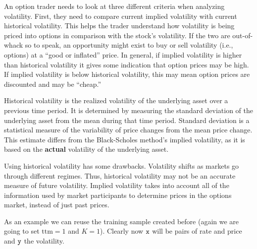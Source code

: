 An option trader needs to look at three different criteria when analyzing volatility. First, they need to compare current implied volatility with current historical volatility. This helps the trader understand how volatility is being priced into options in comparison with the stock’s volatility. If the two are out-of-whack so to speak, an opportunity might exist to buy or sell volatility (i.e., options) at a “good or inflated” price. In general, if implied volatility is higher than historical volatility it gives some indication that option prices may be high. If implied volatility is below historical volatility, this may mean option prices are discounted and may be “cheap.”





Historical volatility is the realized volatility of the underlying asset
over a previous time period. It is determined by measuring the standard
deviation of the underlying asset from the mean during that time period.
Standard deviation is a statistical measure of the variability of price
changes from the mean price change. This estimate differs from the
Black-Scholes method's implied volatility, as it is based on the
\textbf{actual} volatility of the underlying asset.

Using historical volatility has some drawbacks. Volatility shifts as
markets go through different regimes. Thus, historical volatility may
not be an accurate measure of future volatility. Implied volatility
takes into account all of the information used by market participants to
determine prices in the options market, instead of just past prices.

As an example we can reuse the training sample created before (again we
are going to set \(\mathrm{ttm}=1\) and \(K=1\)). Clearly now \(\tt{x}\)
will be pairs of rate and price and \(\tt{y}\) the volatility.

